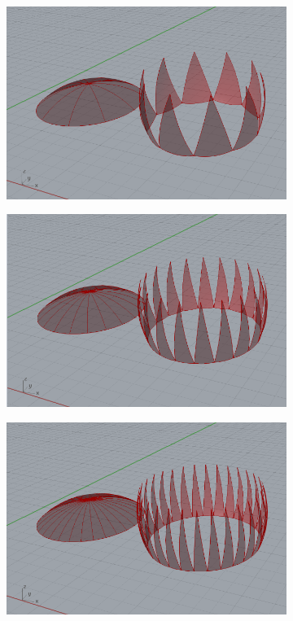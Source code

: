 \documentclass[preprint,12pt,3p]{elsarticle}
\begin{document}
\begin{figure}[h]
\begin{subfigure}{0.3\textwidth}
  \centering
  \includegraphics[width=.9\linewidth]{dome01.png}
  \caption{}
  \label{fig:dome01}
\end{subfigure}%
\begin{subfigure}{0.3\textwidth}
  \centering
  \includegraphics[width=.9\linewidth]{dome02.png}
  \caption{}
  \label{fig:dome02}
\end{subfigure}
\begin{subfigure}{0.3\textwidth}
  \centering
  \includegraphics[width=.9\linewidth]{dome03.png}
  \caption{}
  \label{fig:dome03}
\end{subfigure}



\end{figure}
\end{document}
